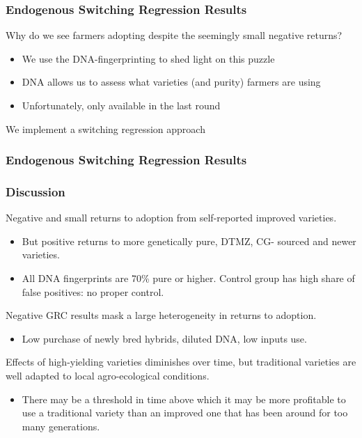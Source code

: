 \documentclass{beamer}
\begin{document}

\begin{frame}
\frametitle{Endogenous Switching Regression Results}

Why do we see farmers adopting despite the seemingly small negative returns?

\begin{itemize}
    \item We use the DNA-fingerprinting to shed light on this puzzle
    \item DNA allows us to assess what varieties (and purity) farmers are using 
    \item Unfortunately, only available in the last round
\end{itemize}

We implement a switching regression approach

\end{frame}


\begin{frame}
\frametitle{Endogenous Switching Regression Results}



 
\end{frame}

\begin{frame}
\frametitle{Discussion}
Negative and small returns to adoption from self-reported improved varieties.
\begin{itemize}
    \item But positive returns to more genetically pure, DTMZ, CG- sourced and newer varieties.
    \item All DNA fingerprints are 70\% pure or higher. Control group has high share of false positives: no proper control. 
    
\end{itemize}
Negative GRC results mask a large heterogeneity in returns to adoption. 
\begin{itemize}
    \item Low purchase of newly bred hybrids, diluted DNA, low inputs use.
 
\end{itemize}  

Effects of high-yielding varieties diminishes over time, but traditional varieties are well adapted to local agro-ecological conditions.

\begin{itemize}
    \item There may be a threshold in time above which it may be more profitable to use a traditional variety than an improved one that has been around for too many generations. 

\end{itemize}


\end{frame}
\end{document}
